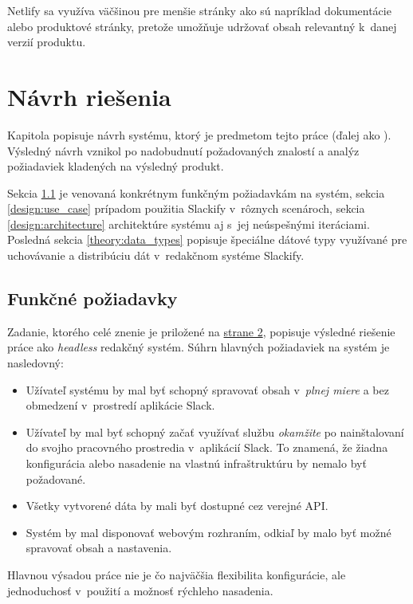 \noindent Netlify sa využíva väčšinou pre menšie stránky ako sú napríklad dokumentácie alebo produktové stránky, pretože umožňuje udržovať obsah relevantný k~danej verzií produktu.

\chapter{Návrh riešenia}
Kapitola popisuje návrh systému, ktorý je predmetom tejto práce (ďalej ako ). Výsledný návrh vznikol po nadobudnutí požadovaných znalostí a analýz požiadaviek kladených na výsledný produkt.

Sekcia \ref{design:assignment} je venovaná konkrétnym funkčným požiadavkám na systém, sekcia \ref{design:use_case} prípadom použitia Slackify v~rôznych scenároch, sekcia \ref{design:architecture} architektúre systému aj s~jej neúspešnými iteráciami. Posledná sekcia \ref{theory:data_types} popisuje špeciálne dátové typy využívané pre uchovávanie a distribúciu dát v~redakčnom systéme Slackify.

\section{Funkčné požiadavky}
\label{design:assignment}
Zadanie, ktorého celé znenie je priložené na \hyperlink{page.2}{strane 2}, popisuje výsledné riešenie práce ako \emph{headless} redakčný systém. Súhrn hlavných požiadaviek na systém je nasledovný:

\begin{itemize}
	\item Užívateľ systému by mal byť schopný spravovať obsah v~\emph{plnej miere} a bez obmedzení v~prostredí aplikácie Slack.
	\item Užívateľ by mal byť schopný začať využívať službu \emph{okamžite} po nainštalovaní do svojho pracovného prostredia v~aplikácií Slack. To znamená, že žiadna konfigurácia alebo nasadenie na vlastnú infraštruktúru by nemalo byť požadované.
	\item Všetky vytvorené dáta by mali byť dostupné cez verejné API.
	\item Systém by mal disponovať webovým rozhraním, odkiaľ by malo byť možné spravovať obsah a nastavenia.
\end{itemize}

\noindent Hlavnou výsadou práce nie je čo najväčšia flexibilita konfigurácie, ale jednoduchosť v~použití a možnosť rýchleho nasadenia. 

